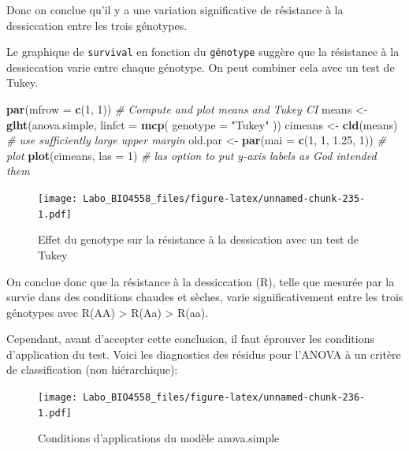 \documentclass[
  12pt,
]{book}
\newenvironment{Shaded}{\begin{snugshade}}{\end{snugshade}}
\newcommand{\CommentTok}[1]{\textcolor[rgb]{0.56,0.35,0.01}{\textit{#1}}}
\newcommand{\DataTypeTok}[1]{\textcolor[rgb]{0.13,0.29,0.53}{#1}}
\newcommand{\DecValTok}[1]{\textcolor[rgb]{0.00,0.00,0.81}{#1}}
\newcommand{\FloatTok}[1]{\textcolor[rgb]{0.00,0.00,0.81}{#1}}
\newcommand{\KeywordTok}[1]{\textcolor[rgb]{0.13,0.29,0.53}{\textbf{#1}}}
\newcommand{\NormalTok}[1]{#1}
\newcommand{\StringTok}[1]{\textcolor[rgb]{0.31,0.60,0.02}{#1}}
\begin{document}
Donc on conclue qu'il y a une variation significative de résistance à la dessiccation entre les trois génotypes.

Le graphique de \texttt{survival} en fonction du \texttt{génotype} suggère que la résistance à la dessiccation varie entre chaque génotype. On peut combiner cela avec un test de Tukey.

\begin{Shaded}
\begin{Highlighting}[]
\KeywordTok{par}\NormalTok{(}\DataTypeTok{mfrow =} \KeywordTok{c}\NormalTok{(}\DecValTok{1}\NormalTok{, }\DecValTok{1}\NormalTok{))}
\CommentTok{\# Compute and plot means and Tukey CI}
\NormalTok{means \textless{}{-}}\StringTok{ }\KeywordTok{glht}\NormalTok{(anova.simple, }\DataTypeTok{linfct =} \KeywordTok{mcp}\NormalTok{(}
  \DataTypeTok{genotype =}
    \StringTok{"Tukey"}
\NormalTok{))}
\NormalTok{cimeans \textless{}{-}}\StringTok{ }\KeywordTok{cld}\NormalTok{(means)}
\CommentTok{\# use sufficiently large upper margin}
\NormalTok{old.par \textless{}{-}}\StringTok{ }\KeywordTok{par}\NormalTok{(}\DataTypeTok{mai =} \KeywordTok{c}\NormalTok{(}\DecValTok{1}\NormalTok{, }\DecValTok{1}\NormalTok{, }\FloatTok{1.25}\NormalTok{, }\DecValTok{1}\NormalTok{))}
\CommentTok{\# plot}
\KeywordTok{plot}\NormalTok{(cimeans, }\DataTypeTok{las =} \DecValTok{1}\NormalTok{) }\CommentTok{\# las option to put y{-}axis labels as God intended them}
\end{Highlighting}
\end{Shaded}

\begin{figure}
\centering
\texttt{[image: Labo\_BIO4558\_files/figure-latex/unnamed-chunk-235-1.pdf]}
\caption{\label{fig:unnamed-chunk-235}Effet du genotype sur la résistance à la dessication avec un test de Tukey}
\end{figure}

On conclue donc que la résistance à la dessiccation (R), telle que mesurée par la survie dans des conditions chaudes et sèches, varie significativement entre les trois génotypes avec R(AA) \textgreater{} R(Aa) \textgreater{} R(aa).

Cependant, avant d'accepter cette conclusion, il faut éprouver les conditions d'application du test. Voici les diagnostics des résidus pour l'ANOVA à un critère de classification (non hiérarchique):

\begin{figure}
\centering
\texttt{[image: Labo\_BIO4558\_files/figure-latex/unnamed-chunk-236-1.pdf]}
\caption{\label{fig:unnamed-chunk-236}Conditions d'applications du modèle anova.simple}
\end{figure}
\end{document}
